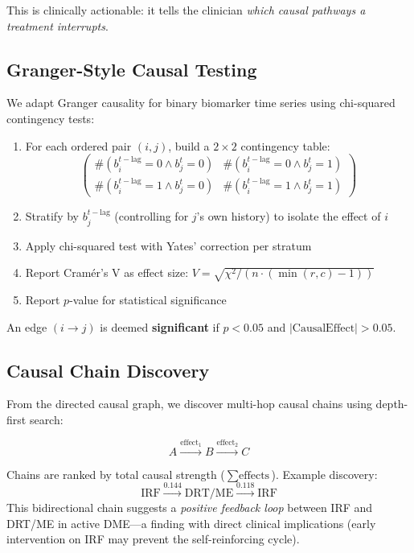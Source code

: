 \documentclass[12pt,a4paper]{article}
\begin{document}
This is clinically actionable: it tells the clinician \emph{which causal pathways a treatment interrupts}.

\subsection{Granger-Style Causal Testing}

We adapt Granger causality for binary biomarker time series using chi-squared contingency tests:

\begin{enumerate}[nosep]
  \item For each ordered pair $(i, j)$, build a $2 \times 2$ contingency table:
    \begin{equation}
    \begin{pmatrix}
      \#(b_i^{t-\text{lag}}=0 \wedge b_j^t=0) & \#(b_i^{t-\text{lag}}=0 \wedge b_j^t=1) \\
      \#(b_i^{t-\text{lag}}=1 \wedge b_j^t=0) & \#(b_i^{t-\text{lag}}=1 \wedge b_j^t=1)
    \end{pmatrix}
    \end{equation}
  \item Stratify by $b_j^{t-\text{lag}}$ (controlling for $j$'s own history) to isolate the effect of $i$
  \item Apply chi-squared test with Yates' correction per stratum
  \item Report Cram\'{e}r's V as effect size: $V = \sqrt{\chi^2 / (n \cdot (\min(r,c)-1))}$
  \item Report $p$-value for statistical significance
\end{enumerate}

An edge $(i \to j)$ is deemed \textbf{significant} if $p < 0.05$ and $|\text{CausalEffect}| > 0.05$.

\subsection{Causal Chain Discovery}

From the directed causal graph, we discover multi-hop causal chains using depth-first search:

\begin{equation}
A \xrightarrow{\text{effect}_1} B \xrightarrow{\text{effect}_2} C
\end{equation}

Chains are ranked by total causal strength ($\sum \text{effects}$). Example discovery:
\[
\text{IRF} \xrightarrow{0.144} \text{DRT/ME} \xrightarrow{0.118} \text{IRF}
\]
This bidirectional chain suggests a \emph{positive feedback loop} between IRF and DRT/ME in active DME---a finding with direct clinical implications (early intervention on IRF may prevent the self-reinforcing cycle).
\end{document}
